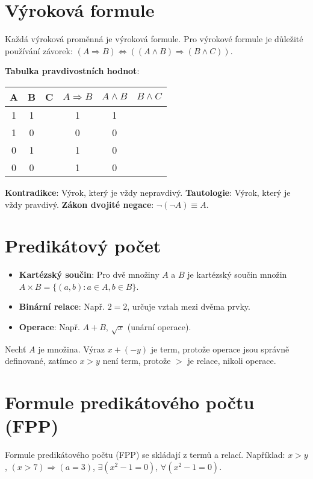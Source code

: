 \documentclass{article}
\begin{document}
\section{Výroková formule}
Každá výroková proměnná je výroková formule.
Pro výrokové formule je důležité používání závorek: \((A \Rightarrow B) \Leftrightarrow ((A \land B) \Rightarrow (B \land C))\).

\textbf{Tabulka pravdivostních hodnot}:
\begin{tabular}{|c|c|c|c|c|c|}
    \hline
    A & B & C & \(A \Rightarrow B\) & \(A \land B\) & \(B \land C\) \\
    \hline
    1 & 1 & & 1 & 1 & \\
    1 & 0 & & 0 & 0 & \\
    0 & 1 & & 1 & 0 & \\
    0 & 0 & & 1 & 0 & \\
    \hline
\end{tabular}

\textbf{Kontradikce}: Výrok, který je vždy nepravdivý.
\textbf{Tautologie}: Výrok, který je vždy pravdivý.
\textbf{Zákon dvojité negace}: \(\neg (\neg A) \equiv A\).

\section{Predikátový počet}
\begin{itemize}
    \item \textbf{Kartézský součin}: Pro dvě množiny \(A\) a \(B\) je kartézský součin množin \(A \times B = \{(a, b) : a \in A, b \in B\}\).
    \item \textbf{Binární relace}: Např. \(2 = 2\), určuje vztah mezi dvěma prvky.
    \item \textbf{Operace}: Např. \(A + B\), \(\sqrt{x}\) (unární operace).
\end{itemize}

Nechť \(A\) je množina. Výraz \(x + (-y)\) je term, protože operace jsou správně definované, zatímco \(x > y\) není term, protože \(>\) je relace, nikoli operace.

\section{Formule predikátového počtu (FPP)}
Formule predikátového počtu (FPP) se skládají z termů a relací. Například:
\(x > y\), \((x > 7) \Rightarrow (a = 3)\), \(\exists (x^2 - 1 = 0)\), \(\forall (x^2 - 1 = 0)\).
\end{document}
